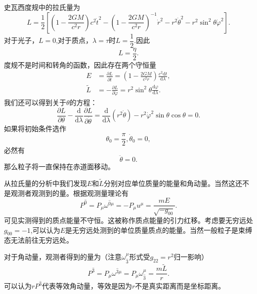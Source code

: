 \documentclass[11pt, a4paper, oneside, onecolumn]{ctexart}
\numberwithin{equation}{subsection}
\begin{document}
史瓦西度规中的拉氏量为
\begin{equation}
L=\frac12\left[\left(1-\frac{2GM}{c^{2}r}\right)c^{2}\dot{t}^{2}-\left(1-\frac{2GM}{c^{2}r}\right)^{-1}\dot{r}^{2}-r^{2}\dot{\theta}^{2}-r^{2}\sin^{2}\theta\dot{\varphi}^{2}\right].
\end{equation}
对于光子，$L=0$,对于质点，$\lambda=\tau$时$L=\dfrac12$.因此
\begin{equation}
L=\frac{\eta}{2}.
\end{equation}
度规不是时间和转角的函数，因此存在两个守恒量
\begin{align}
E&=\frac{\partial{}L}{\partial{}\dot{t}}=\left(1-\frac{2GM}{c^{2}r}\right)\frac{c^{2}\mathrm{d}t}{\mathrm{d}\lambda},\\
\widetilde{L}&=-\frac{\partial{}L}{\partial{}\dot{\varphi}}=r^{2}\sin^{2}\theta\frac{\mathrm{d}\varphi}{\mathrm{d}\lambda}.
\end{align}
我们还可以得到关于$\theta$的方程：
\begin{equation}
\frac{\partial{}L}{\partial{}\theta}-\frac{\mathrm{d}}{\mathrm{d}\lambda}\frac{\partial{}L}{\partial{}\dot{\theta}}=\frac{\mathrm{d}}{\mathrm{d}\lambda}\left(r^{2}\dot{\theta}\right)-r^{2}\dot{\varphi}^{2}\sin\theta\cos\theta=0.
\end{equation}
如果将初始条件选作
\begin{equation}
\theta_{0}=\frac{\pi}{2},\dot{\theta}_{0}=0,
\end{equation}
必然有
\begin{equation}
\ddot{\theta}=0.
\end{equation}
那么粒子将一直保持在赤道面移动。

\newpage
从拉氏量的分析中我们发现$E$和$\widetilde{L}$分别对应单位质量的能量和角动量。当然这还不是观测者观测到的量。根据观测量理论有
\begin{equation}
P^{\hat{0}}=P_{\mu}\omega^{\hat{0}\mu}=-P_{\mu}u^{\mu}=\frac{mE}{\sqrt{-g_{00}}}.
\end{equation}
可见实测得到的质点能量不守恒。这被称作质点能量的引力红移。考虑要无穷远处$g_{00}=-1$,可以认为$E$是无穷远处测到的单位质量质点的能量。当然一般粒子是束缚态无法前往无穷远处。

对于角动量，观测者得到的量为（注意$\omega_{\hat{3}}^{\mu}$形式受$g_{22}=r^{2}$归一影响）
\begin{equation}
P^{\hat{3}}=P_{\mu}\omega^{\hat{3}\mu}=P_{\mu}\omega^{\mu}_{\hat{3}}=\frac{m\widetilde{L}}{r}.
\end{equation}
可以认为$r P^{\hat{3}}$代表等效角动量，等效是因为$r$不是真实距离而是坐标距离。
\end{document}
